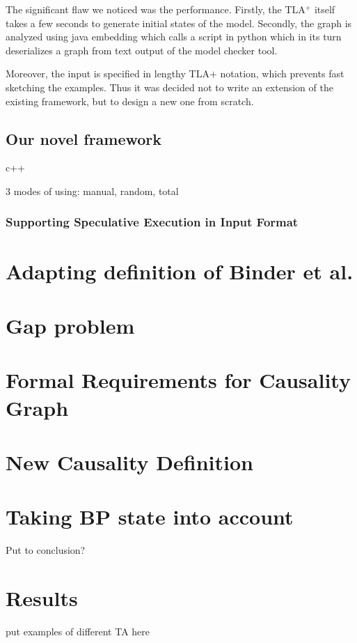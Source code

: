 The significant flaw we noticed was the performance. Firstly, the TLA$^+$ itself takes a few seconds to generate initial states of the model. Secondly, the graph is analyzed using java embedding which calls a script in python which in its turn deserializes a graph from text output of the model checker tool. 

Moreover, the input is specified in lengthy TLA$+$ notation, which prevents fast sketching the examples. Thus it was decided not to write an extension of the existing framework, but to design a new one from scratch.

\subsection{Our novel framework}

c++

3 modes of using: manual, random, total

\subsubsection{Supporting Speculative Execution in Input Format}

\section{Adapting definition of Binder et al.}



\section{Gap problem}

\section{Formal Requirements for Causality Graph}

\section{New Causality Definition}

\section{Taking BP state into account}
Put to conclusion?

\section{Results}

put examples of different TA here